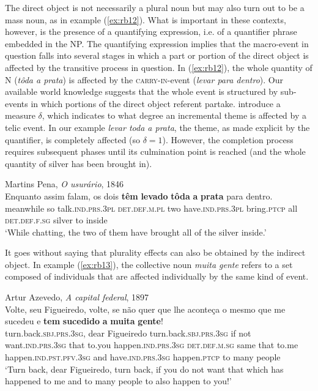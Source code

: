 \documentclass[output=paper,colorlinks,citecolor=brown]{langscibook}
\begin{document}
The direct object is not necessarily a plural noun but may also turn out to be a mass noun, as in example (\ref{ex:rb12}). What is important in these contexts, however, is the presence of a quantifying expression, i.e. of a quantifier phrase embedded in the NP. The quantifying expression implies that the macro-event in question falls into several stages in which a part or portion of the direct object is affected by the transitive process in question. In (\ref{ex:rb12}), the whole quantity of N (\textit{tôda a prata}) is affected by the \textsc{carry-in}-event (\textit{levar para dentro}). Our available world knowledge suggests that the whole event is structured by sub-events in which portions of the direct object referent partake. \citet{BertinettoCivardi2015} introduce a measure $\delta$, which indicates to what degree an incremental theme is affected by a telic event. In our example \textit{levar toda a prata}, the theme, as made explicit by the quantifier, is completely affected (so $\delta=1$). However, the completion process requires subsequent phases until its culmination point is reached (and the whole quantity of silver has been brought in).

\ea\label{ex:rb12}
Martins Pena, \textit{O usurário}, 1846\\
\gll Enquanto assim falam, os dois \textbf{têm} \textbf{levado} \textbf{tôda} \textbf{a} \textbf{prata} para dentro.\\
meanwhile so talk.\textsc{ind.prs.3pl} \textsc{det.def.m.pl} two have.\textsc{ind.prs.3pl} bring.\textsc{ptcp} all \textsc{det.def.f.sg} silver to inside\\
\glt ‘While chatting, the two of them have brought all of the silver inside.’
\z

It goes without saying that plurality effects can also be obtained by the indirect object. In example (\ref{ex:rb13}), the collective noun \textit{muita gente} refers to a set composed of individuals that are affected individually by the same kind of event.

\ea\label{ex:rb13}
Artur Azevedo, \textit{A capital federal}, 1897\\
\gll Volte, seu Figueiredo, volte, se não quer que lhe aconteça o mesmo que me sucedeu e \textbf{tem} \textbf{sucedido} \textbf{a} \textbf{muita} \textbf{gente}!\\
turn.back.\textsc{sbj.prs.3sg}, dear Figueiredo turn.back.\textsc{sbj.prs.3sg} if not want.\textsc{ind.prs.3sg} that to.you happen.\textsc{ind.prs.3sg} \textsc{det.def.m.sg} same that to.me happen.\textsc{ind.pst.pfv.3sg} and have.\textsc{ind.prs.3sg} happen.\textsc{ptcp} to many people\\
\glt ‘Turn back, dear Figueiredo, turn back, if you do not want that which has happened to me and to many people to also happen to you!’
\z
\end{document}
